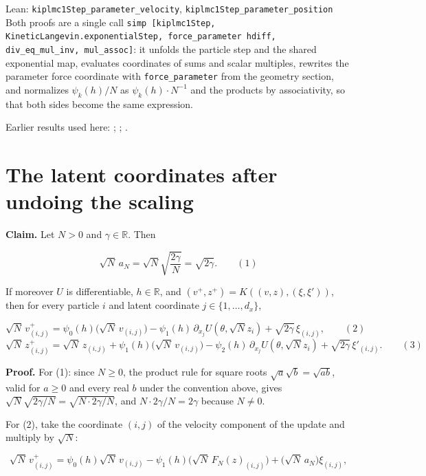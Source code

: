 \documentclass[11pt,a4paper]{article}
\begin{document}
\begin{leanbox}{Lean: \texttt{kiplmc1Step\_\allowbreak{}parameter\_\allowbreak{}velocity}, \texttt{kiplmc1Step\_\allowbreak{}parameter\_\allowbreak{}position}}
Both proofs are a single call \texttt{simp [kiplmc1\allowbreak{}Step, Kinetic\allowbreak{}Langevin.\allowbreak{}exponential\allowbreak{}Step, force\_\allowbreak{}parameter hdiff, div\_\allowbreak{}eq\_\allowbreak{}mul\_\allowbreak{}inv, mul\_\allowbreak{}assoc]}: it unfolds the particle step and the shared exponential map, evaluates coordinates of sums and scalar multiples, rewrites the parameter force coordinate with \texttt{force\_\allowbreak{}parameter} from the geometry section, and normalizes \(\psi_k(h)/N\) as \(\psi_k(h)\cdot N^{-1}\) and the products by associativity, so that both sides become the same expression.
\end{leanbox}


Earlier results used here: \cite[Section~3.1.1]{LangevinLean2026IPLA}; \cite[Section~3.10.1]{LangevinLean2026Kinetic}; \cite[Section~3.12.2]{LangevinLean2026Kinetic}.

\section{\texorpdfstring{The latent coordinates after undoing the scaling}{The latent coordinates after undoing the scaling}}


\textbf{Claim.} Let \(N>0\) and \(\gamma\in\mathbb R\). Then


\[\sqrt N\,a_N=\sqrt N\sqrt{\frac{2\gamma}N}=\sqrt{2\gamma}.\qquad(1)\]


If moreover \(U\) is differentiable, \(h\in\mathbb R\), and \((v^+,z^+)=K((v,z),(\xi,\xi'))\), then for every particle \(i\) and latent coordinate \(j\in\{1,\dots,d_x\}\),


\[\sqrt N\,v^+_{(i,j)}=\psi_0(h)\bigl(\sqrt N\,v_{(i,j)}\bigr)-\psi_1(h)\,\partial_{x_j}U(\theta,\sqrt Nz_i)+\sqrt{2\gamma}\,\xi_{(i,j)},\qquad(2)\]
\[\sqrt N\,z^+_{(i,j)}=\sqrt N\,z_{(i,j)}+\psi_1(h)\bigl(\sqrt N\,v_{(i,j)}\bigr)-\psi_2(h)\,\partial_{x_j}U(\theta,\sqrt Nz_i)+\sqrt{2\gamma}\,\xi'_{(i,j)}.\qquad(3)\]


\textbf{Proof.} For (1): since \(N\ge0\), the product rule for square roots \(\sqrt a\sqrt b=\sqrt{ab}\), valid for \(a\ge0\) and every real \(b\) under the convention above, gives \(\sqrt N\sqrt{2\gamma/N}=\sqrt{N\cdot2\gamma/N}\), and \(N\cdot2\gamma/N=2\gamma\) because \(N\ne0\).




For (2), take the coordinate \((i,j)\) of the velocity component of the update and multiply by \(\sqrt N\):


\[\sqrt N\,v^+_{(i,j)}=\psi_0(h)\sqrt N\,v_{(i,j)}-\psi_1(h)\bigl(\sqrt N\,F_N(z)_{(i,j)}\bigr)+\bigl(\sqrt N\,a_N\bigr)\xi_{(i,j)},\]
\end{document}
